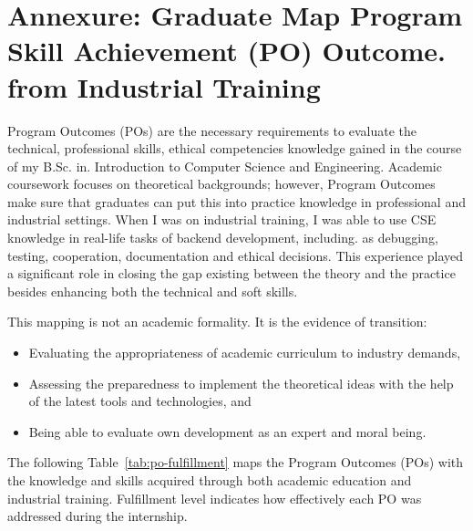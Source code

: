 \clearpage
\chapter*{Annexure: Graduate Map Program
Skill Achievement (PO) Outcome.
from Industrial Training}

\par Program Outcomes (POs) are the necessary requirements to evaluate the technical, professional skills, ethical competencies knowledge gained in the course of my B.Sc. in.
Introduction to Computer Science and Engineering.
Academic coursework focuses on theoretical backgrounds; however, Program Outcomes make sure that graduates can put this into practice knowledge in professional and
industrial settings. When I was on industrial training, I was able to use CSE knowledge
in real-life tasks of backend development, including. as debugging, testing, cooperation, documentation and ethical decisions. This experience played a significant role in
closing the gap existing between the theory and the practice besides enhancing both the
technical and soft skills.

\par This mapping is not an academic formality. It is the evidence of transition:
\begin{itemize}
    \item Evaluating the appropriateness of academic curriculum to industry demands,
    \item Assessing the preparedness to implement the theoretical ideas with the help of
the latest tools and technologies, and
    \item  Being able to evaluate own development as an expert and moral being.
\end{itemize}

\par The following Table~\ref{tab:po-fulfillment} maps the Program Outcomes (POs) with the knowledge and skills acquired through both academic education and industrial training. Fulfillment level indicates how effectively each PO was addressed during the internship.


